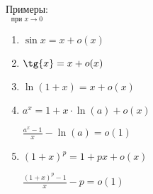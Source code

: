 $\underset{\text{при } x \longrightarrow 0}{\textbf{Примеры:}}$
\begin{enumerate}
    \item $\sin{x} = x + o(x)$
    \item $\tg{x} = x + o(x)$
    \item $\ln{(1 + x)} = x + o(x)$
    \item $a^x = 1 + x \cdot \ln{(a)} + o(x)$
    
    $\frac{a^x - 1}{x} - \ln{(a)} = o(1)$
    \item $(1 + x)^p = 1 + px + o(x)$
    
    $\frac{(1 + x)^p - 1}{x} - p = o(1)$
\end{enumerate}

